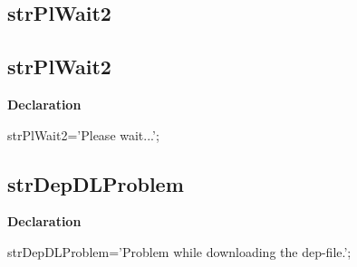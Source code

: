 \documentclass{report}
\newif\ifpdf
\begin{document}
\subsection*{\large{\textbf{strPlWait2}}\normalsize\hspace{1ex}\hrulefill}
\else
\subsection*{strPlWait2}
\fi
\label{trstrings-strPlWait2}
\begin{list}{}{
\setlength{\itemindent}{0cm}
\setlength{\listparindent}{0cm}
\setlength{\leftmargin}{\evensidemargin}
\addtolength{\leftmargin}{\tmplength}
\settowidth{\labelsep}{X}
\addtolength{\leftmargin}{\labelsep}
\setlength{\labelwidth}{\tmplength}
}
\item[\textbf{Declaration}\hfill]
\ifpdf
\begin{flushleft}
\fi
\begin{ttfamily}
strPlWait2='Please wait...';\end{ttfamily}

\ifpdf
\end{flushleft}
\fi

\end{list}
\ifpdf
\subsection*{\large{\textbf{strDepDLProblem}}\normalsize\hspace{1ex}\hrulefill}
\else
\subsection*{strDepDLProblem}
\fi
\label{trstrings-strDepDLProblem}
\begin{list}{}{
\setlength{\itemindent}{0cm}
\setlength{\listparindent}{0cm}
\setlength{\leftmargin}{\evensidemargin}
\addtolength{\leftmargin}{\tmplength}
\settowidth{\labelsep}{X}
\addtolength{\leftmargin}{\labelsep}
\setlength{\labelwidth}{\tmplength}
}
\item[\textbf{Declaration}\hfill]
\ifpdf
\begin{flushleft}
\fi
\begin{ttfamily}
strDepDLProblem='Problem while downloading the dep-file.';\end{ttfamily}

\ifpdf
\end{flushleft}
\fi

\end{list}
\ifpdf
\end{document}
